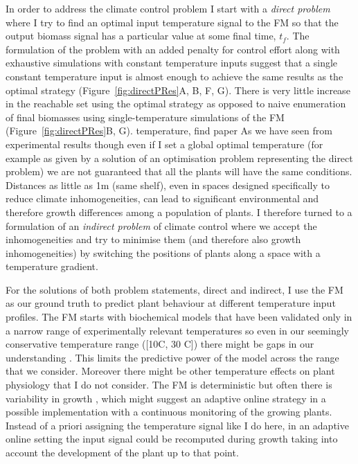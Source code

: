 
In order to address the climate control problem I start with a \emph{direct
  problem} where I try to find an optimal input temperature signal to the FM so
that the output biomass signal has a particular value at some final time,
$t_f$. The formulation of the problem with an added penalty for control effort
along with exhaustive simulations with constant temperature inputs suggest that
a single constant temperature input is almost enough to achieve the same results
as the optimal strategy (Figure~\ref{fig:directPRes}A, B, F, G). There is very
little increase in the reachable set using the optimal strategy as opposed to
naive enumeration of final biomasses using single-temperature simulations of the
FM (Figure~\ref{fig:directPRes}B, G).  %
temperature, find paper As we have seen from experimental results though even if
I set a global optimal temperature (for example as given by a solution of an
optimisation problem representing the direct problem) we are not guaranteed that
all the plants will have the same conditions. Distances as little as 1m (same
shelf), even in spaces designed specifically to reduce climate inhomogeneities,
can lead to significant environmental and therefore growth differences among a
population of plants. I therefore turned to a formulation of an \emph{indirect
  problem} of climate control where we accept the inhomogeneities and try to
minimise them (and therefore also growth inhomogeneities) by switching the
positions of plants along a space with a temperature gradient.

For the solutions of both problem statements, direct and indirect, I use the FM
as our ground truth to predict plant behaviour at different temperature input
profiles. The FM starts with biochemical models that have been validated only in
a narrow range of experimentally relevant temperatures so even in our seemingly
conservative temperature range ([10\textdegree C, 30 \textdegree C]) there might
be gaps in our understanding \citep{walker_temperature_2013}. This limits the
predictive power of the model across the range that we consider. Moreover there
might be other temperature effects on plant physiology that I do not
consider. The FM is deterministic but often there is variability in growth
\citep{abley2016developmental}, which might suggest an adaptive online strategy
in a possible implementation with a continuous monitoring of the growing
plants. Instead of a priori assigning the temperature signal like I do here, in
an adaptive online setting the input signal could be recomputed during growth
taking into account the development of the plant up to that point.

